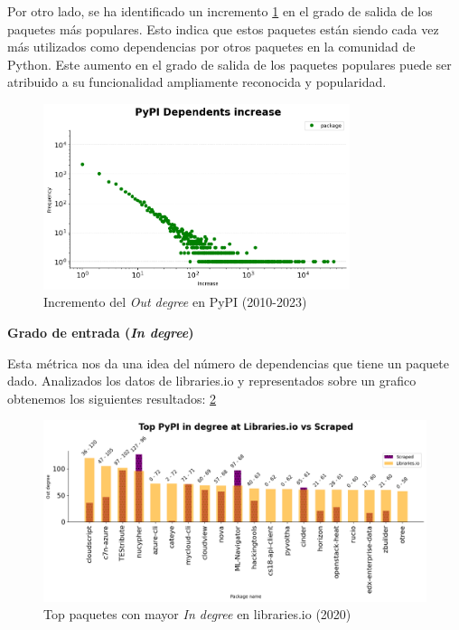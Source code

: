 Por otro lado, se ha identificado un incremento \ref{fig:dependents_increase} en el grado de salida de los paquetes más populares.
Esto indica que estos paquetes están siendo cada vez más utilizados como dependencias por otros paquetes
en la comunidad de Python. Este aumento en el grado de salida de los paquetes populares puede ser atribuido
a su funcionalidad ampliamente reconocida y popularidad.

\begin{figure}[h!]
    \begin{center}
        \includegraphics[width=0.8\textwidth]{img/pypi/dependents_increase.png}
        \caption{Incremento del \textit{Out degree} en PyPI (2010-2023)}
        \label{fig:dependents_increase}
    \end{center}
\end{figure}


\textbf{Grado de entrada (\textit{In degree})}

Esta métrica nos da una idea del número de dependencias que tiene un paquete dado.
Analizados los datos de libraries.io y representados sobre un grafico obtenemos los siguientes resultados: \ref{fig:pypi_libio_ind_comparison}

\begin{figure}[h!]
    \begin{center}
        \includegraphics[width=1\textwidth]{img/pypi/libio_t20_ind_comparison.png}
        \caption{Top paquetes con mayor \textit{In degree} en libraries.io (2020)}
        \label{fig:pypi_libio_ind_comparison}
    \end{center}
\end{figure}

